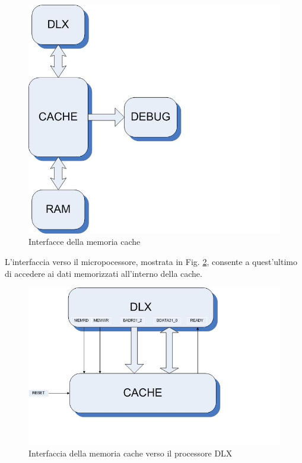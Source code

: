 \begin{figure}[!h]
 \centering
\includegraphics{img/01-interfacce_schema_generale.jpg}
 \caption{Interfacce della memoria cache}
 \label{fig:int_gen}
\end{figure}


L'interfaccia verso il micropocessore, mostrata in Fig. \ref{fig:int_dlx}, consente a quest'ultimo di accedere ai dati memorizzati all'interno della cache. 

\begin{figure}[!h]
 \centering
\includegraphics{img/dlx-cache.jpg}
 \caption{Interfaccia della memoria cache verso il processore DLX}
 \label{fig:int_dlx}
\end{figure}

